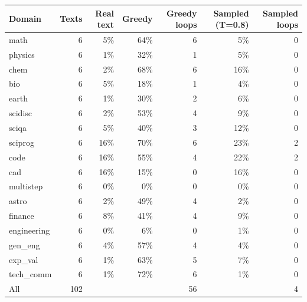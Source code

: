 \begin{tabular}{lrrrrrr}
\toprule
Domain & Texts & Real text & Greedy & Greedy loops & Sampled (T=0.8) & Sampled loops \\
\midrule
math & 6 & 5\% & 64\% & 6 & 5\% & 0 \\
physics & 6 & 1\% & 32\% & 1 & 5\% & 0 \\
chem & 6 & 2\% & 68\% & 6 & 16\% & 0 \\
bio & 6 & 5\% & 18\% & 1 & 4\% & 0 \\
earth & 6 & 1\% & 30\% & 2 & 6\% & 0 \\
scidisc & 6 & 2\% & 53\% & 4 & 9\% & 0 \\
sciqa & 6 & 5\% & 40\% & 3 & 12\% & 0 \\
sciprog & 6 & 16\% & 70\% & 6 & 23\% & 2 \\
code & 6 & 16\% & 55\% & 4 & 22\% & 2 \\
cad & 6 & 16\% & 15\% & 0 & 16\% & 0 \\
multistep & 6 & 0\% & 0\% & 0 & 0\% & 0 \\
astro & 6 & 2\% & 49\% & 4 & 2\% & 0 \\
finance & 6 & 8\% & 41\% & 4 & 9\% & 0 \\
engineering & 6 & 0\% & 6\% & 0 & 1\% & 0 \\
gen\_eng & 6 & 4\% & 57\% & 4 & 4\% & 0 \\
exp\_val & 6 & 1\% & 63\% & 5 & 7\% & 0 \\
tech\_comm & 6 & 1\% & 72\% & 6 & 1\% & 0 \\
\midrule All & 102 & & & 56 & & 4 \\
\bottomrule
\end{tabular}
